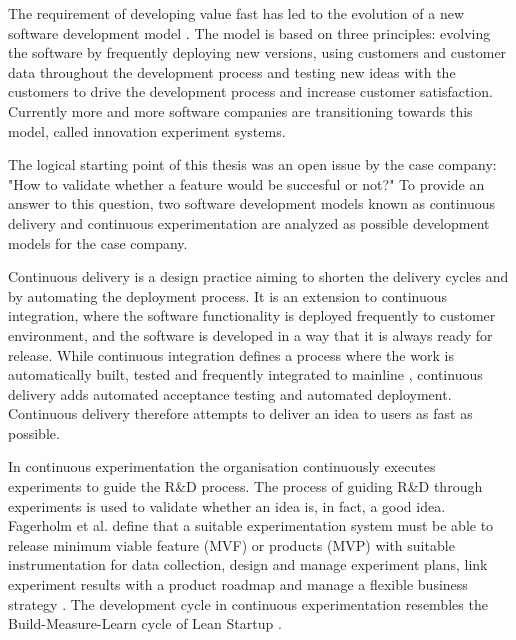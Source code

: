 \documentclass[english, grading]{tktltiki2}
\theoremstyle{definition}
\theoremstyle{remark}
\begin{document}
The requirement of developing value fast has led to the evolution of a new software development model \cite{bosch2012building}. The model is based on three principles: evolving the software by frequently deploying new versions, using customers and customer data throughout the development process and testing new ideas with the customers to drive the development process and increase customer satisfaction. Currently more and more software companies are transitioning towards this model, called innovation experiment systems. 

The logical starting point of this thesis was an open issue by the case company: "How to validate whether a feature would be succesful or not?" To provide an answer to this question, two software development models known as continuous delivery and continuous experimentation are analyzed as possible development models for the case company.


Continuous delivery is a design practice aiming to shorten the delivery cycles and by automating the deployment process. It is an extension to continuous integration, where the software functionality is deployed frequently to customer environment, and the software is developed in a way that it is always ready for release. While continuous integration defines a process where the work is automatically built, tested and frequently integrated to mainline \cite{duvall2007continuous}, continuous delivery adds automated acceptance testing and automated deployment. Continuous delivery therefore attempts to deliver an idea to users as fast as possible.

In continuous experimentation the organisation continuously executes experiments to guide the R\&D process. The process of guiding R\&D through experiments is used to validate whether an idea is, in fact, a good idea. Fagerholm et al. define that a suitable experimentation system must be able to release minimum viable feature (MVF) or products (MVP) with suitable instrumentation for data collection, design and manage experiment plans, link experiment results with a product roadmap and manage a flexible business strategy \cite{fagerholm2014building}. The development cycle in continuous experimentation resembles the Build-Measure-Learn cycle of Lean Startup \cite{ries2011lean}. 
\end{document}
